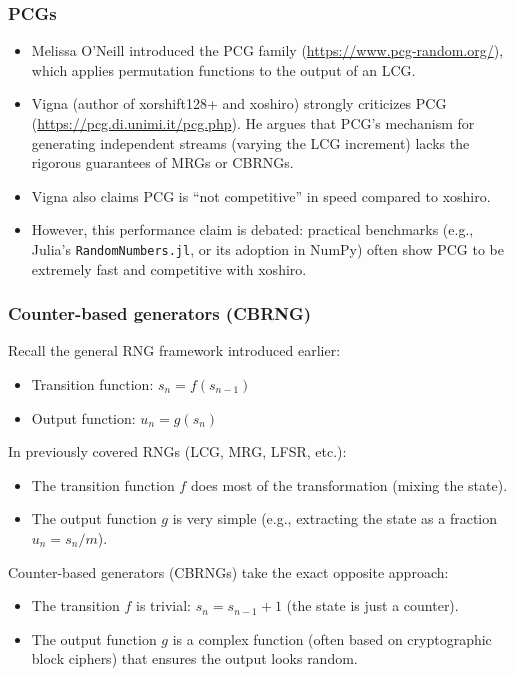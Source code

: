 \documentclass[aspectratio=169]{beamer}
\def\blue{\color{blue}}
\begin{document}
\begin{frame}
\frametitle{PCGs}

\begin{itemize}
\item
Melissa O'Neill introduced the PCG family (\url{https://www.pcg-random.org/}), which applies permutation functions to the output of an LCG.
\item
Vigna (author of xorshift128+ and xoshiro) strongly criticizes PCG (\url{https://pcg.di.unimi.it/pcg.php}). He argues that PCG's mechanism for generating independent streams (varying the LCG increment) lacks the rigorous guarantees of MRGs or CBRNGs.
\item
Vigna also claims PCG is ``not competitive'' in speed compared to xoshiro. 
\item
However, this performance claim is debated: practical benchmarks (e.g., Julia's \texttt{RandomNumbers.jl}, or its adoption in NumPy) often show PCG to be extremely fast and competitive with xoshiro.
\end{itemize}

\end{frame}

\begin{frame}
\frametitle{Counter-based generators (CBRNG)}

Recall the general RNG framework introduced earlier:
\begin{itemize}
	\item {\blue Transition function}: $s_n = f(s_{n-1})$
	\item {\blue Output function}: $u_n = g(s_n)$
\end{itemize}

\mbox{}

In previously covered RNGs (LCG, MRG, LFSR, etc.):
\begin{itemize}
\item The transition function $f$ does most of the transformation (mixing the state).
\item The output function $g$ is very simple (e.g., extracting the state as a fraction $u_n = s_n / m$).
\end{itemize}

\mbox{}

{\blue Counter-based generators} (CBRNGs) take the exact opposite approach:
\begin{itemize}
\item The transition $f$ is trivial: $s_n = s_{n-1} + 1$ (the state is just a counter).
\item The output function $g$ is a complex function (often based on cryptographic block ciphers) that ensures the output looks random.
\end{itemize}

\end{frame}
\end{document}
